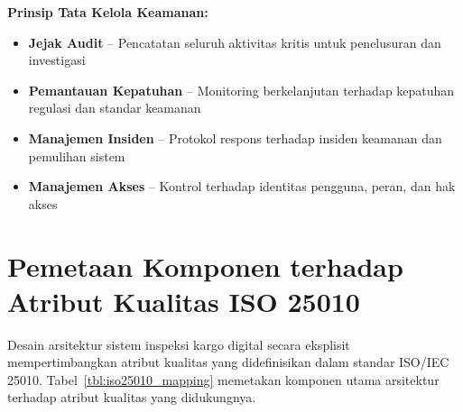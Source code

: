 \textbf{Prinsip Tata Kelola Keamanan:}
\begin{itemize}
  \item \textbf{Jejak Audit} -- Pencatatan seluruh aktivitas kritis untuk penelusuran dan investigasi
  \item \textbf{Pemantauan Kepatuhan} -- Monitoring berkelanjutan terhadap kepatuhan regulasi dan standar keamanan
  \item \textbf{Manajemen Insiden} -- Protokol respons terhadap insiden keamanan dan pemulihan sistem
  \item \textbf{Manajemen Akses} -- Kontrol terhadap identitas pengguna, peran, dan hak akses
\end{itemize}


\section{Pemetaan Komponen terhadap Atribut Kualitas ISO 25010}
\label{sec:pemetaan-iso25010}

Desain arsitektur sistem inspeksi kargo digital secara eksplisit mempertimbangkan atribut kualitas yang didefinisikan dalam standar ISO/IEC 25010. Tabel~\ref{tbl:iso25010_mapping} memetakan komponen utama arsitektur terhadap atribut kualitas yang didukungnya.

